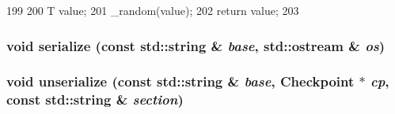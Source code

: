 \begin{DoxyCode}
199     {
200         T value;
201         _random(value);
202         return value;
203     }
\end{DoxyCode}
\hypertarget{classRandom_ab4138b21b48e3371a8e20df72b675a88}{
\subsubsection[{serialize}]{\setlength{\rightskip}{0pt plus 5cm}void serialize (const std::string \& {\em base}, \/  std::ostream \& {\em os})}}
\label{classRandom_ab4138b21b48e3371a8e20df72b675a88}
\hypertarget{classRandom_a147c320e3d6506edf5587a40cd8e430d}{
\subsubsection[{unserialize}]{\setlength{\rightskip}{0pt plus 5cm}void unserialize (const std::string \& {\em base}, \/  {\bf Checkpoint} $\ast$ {\em cp}, \/  const std::string \& {\em section})}}
\label{classRandom_a147c320e3d6506edf5587a40cd8e430d}


